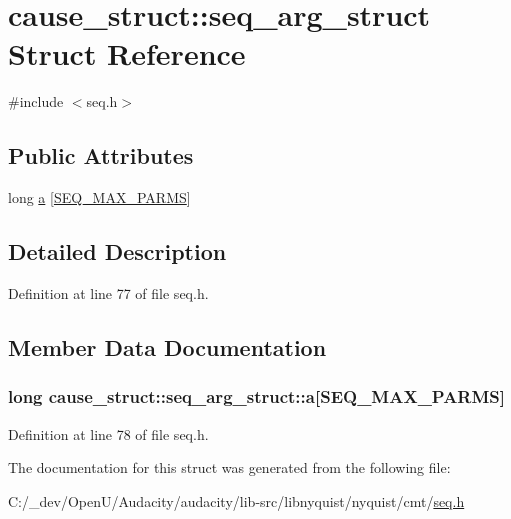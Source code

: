 \hypertarget{structcause__struct_1_1seq__arg__struct}{}\section{cause\+\_\+struct\+:\+:seq\+\_\+arg\+\_\+struct Struct Reference}
\label{structcause__struct_1_1seq__arg__struct}


{\ttfamily \#include $<$seq.\+h$>$}

\subsection*{Public Attributes}
\begin{DoxyCompactItemize}
\item 
long \hyperlink{structcause__struct_1_1seq__arg__struct_af0d18d0940416c213796c3ec28d7ce52}{a} \mbox{[}\hyperlink{seq_8h_add3c3c6d5c86beef3f20797a57b43248}{S\+E\+Q\+\_\+\+M\+A\+X\+\_\+\+P\+A\+R\+MS}\mbox{]}
\end{DoxyCompactItemize}


\subsection{Detailed Description}


Definition at line 77 of file seq.\+h.



\subsection{Member Data Documentation}
\subsubsection[{\texorpdfstring{a}{a}}]{\setlength{\rightskip}{0pt plus 5cm}long cause\+\_\+struct\+::seq\+\_\+arg\+\_\+struct\+::a\mbox{[}{\bf S\+E\+Q\+\_\+\+M\+A\+X\+\_\+\+P\+A\+R\+MS}\mbox{]}}\hypertarget{structcause__struct_1_1seq__arg__struct_af0d18d0940416c213796c3ec28d7ce52}{}\label{structcause__struct_1_1seq__arg__struct_af0d18d0940416c213796c3ec28d7ce52}


Definition at line 78 of file seq.\+h.



The documentation for this struct was generated from the following file\+:\begin{DoxyCompactItemize}
\item 
C\+:/\+\_\+dev/\+Open\+U/\+Audacity/audacity/lib-\/src/libnyquist/nyquist/cmt/\hyperlink{seq_8h}{seq.\+h}\end{DoxyCompactItemize}
